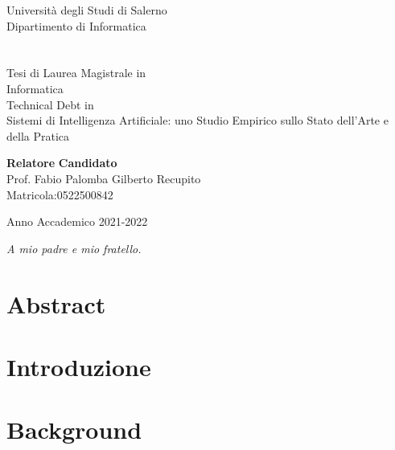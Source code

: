 \documentclass[a4paper,12pt,oneside,top=6cm,bottom=3cm,left=3.5cm,right=3.5cm,openright,reqno,table]{book}
\begin{document}
\begin{titlepage}
\begin{center}
{\Large Universit\`a degli Studi di Salerno}\\[0.2truecm]
{\large Dipartimento di Informatica}\\

\hrulefill\\
\vspace{0.5cm}
\\[0.2truecm]
\vspace{0.5cm}
{\Large Tesi di Laurea Magistrale in }\\[0.2truecm]
{\Large Informatica}\\
\vspace{3cm}
{\huge Technical Debt in }\\[0.2truecm]
{\huge Sistemi di Intelligenza Artificiale:}\break
{\huge uno Studio Empirico sullo Stato dell'Arte e della Pratica}\\
\vfill

{\bf Relatore} \hfill {\bf Candidato}\ \ \\
Prof. Fabio Palomba \hfill Gilberto Recupito\\
    \hfill Matricola:0522500842

\hrulefill 

Anno Accademico 2021-2022

\end{center}
\end{titlepage}
\clearpage
\vfill
\hfill \textit{A mio padre e mio fratello.}
\chapter*{Abstract}


\vfill
\tableofcontents

\chapter{Introduzione}

 
\chapter{Background}


\end{document}
